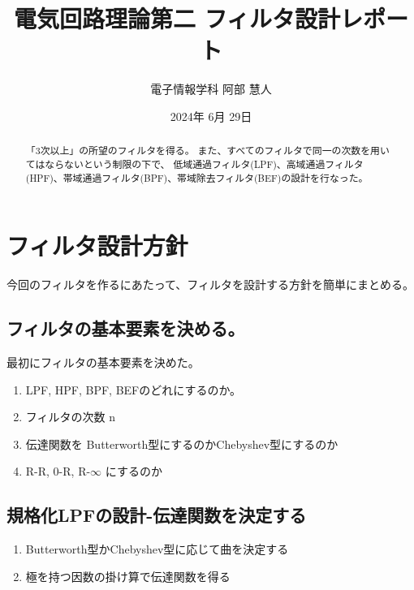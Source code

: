\documentclass[a4j,twocolumn]{jsarticle}
\title{電気回路理論第二 フィルタ設計レポート}
\author{電子情報学科 阿部 慧人}
\date{2024年 6月 29日}
\begin{document}
\begin{abstract}
「3次以上」の所望のフィルタを得る。
また、すべてのフィルタで同一の次数を用いてはならないという制限の下で、
低域通過フィルタ(LPF)、高域通過フィルタ(HPF)、帯域通過フィルタ(BPF)、帯域除去フィルタ(BEF)の設計を行なった。
\end{abstract}

\maketitle
\section{フィルタ設計方針}
今回のフィルタを作るにあたって、フィルタを設計する方針を簡単にまとめる。
\subsection{フィルタの基本要素を決める。}
最初にフィルタの基本要素を決めた。
\begin{enumerate}
\item LPF, HPF, BPF, BEFのどれにするのか。
\item フィルタの次数 n
\item 伝達関数を Butterworth型にするのかChebyshev型にするのか
\item R-R, 0-R, R-$\infty$ にするのか
\end{enumerate}

\subsection{規格化LPFの設計-伝達関数を決定する}
\begin{enumerate}
\item Butterworth型かChebyshev型に応じて曲を決定する
\item 極を持つ因数の掛け算で伝達関数を得る
\end{enumerate}
\end{document}
